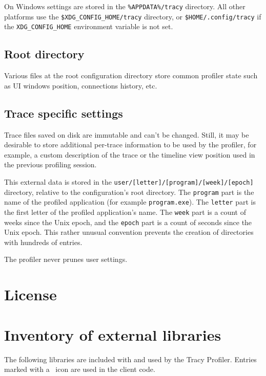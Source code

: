 \documentclass[hidelinks,titlepage,a4paper,twoside]{article}
\begin{document}
On Windows settings are stored in the \texttt{\%APPDATA\%/tracy} directory. All other platforms use the \texttt{\$XDG\_CONFIG\_HOME/tracy} directory, or \texttt{\$HOME/.config/tracy} if the \texttt{XDG\_CONFIG\_HOME} environment variable is not set.

\subsection{Root directory}

Various files at the root configuration directory store common profiler state such as UI windows position, connections history, etc.

\subsection{Trace specific settings}
\label{tracespecific}

Trace files saved on disk are immutable and can't be changed. Still, it may be desirable to store additional per-trace information to be used by the profiler, for example, a custom description of the trace or the timeline view position used in the previous profiling session.

This external data is stored in the \texttt{user/[letter]/[program]/[week]/[epoch]} directory, relative to the configuration's root directory. The \texttt{program} part is the name of the profiled application (for example \texttt{program.exe}). The \texttt{letter} part is the first letter of the profiled application's name. The \texttt{week} part is a count of weeks since the Unix epoch, and the \texttt{epoch} part is a count of seconds since the Unix epoch. This rather unusual convention prevents the creation of directories with hundreds of entries.

The profiler never prunes user settings.

\newpage
\appendix
\appendixpage

\section{License}



\section{Inventory of external libraries}

The following libraries are included with and used by the Tracy Profiler. Entries marked with a \faStar{}~icon are used in the client code.
\end{document}

